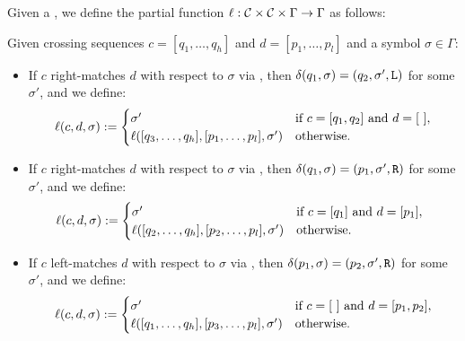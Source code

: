 \begin{defn}
	Given a \kDLA, we define the partial function $\ell:\mathcal C\times\mathcal C\times\Gamma\to\Gamma$ as follows:

	Given crossing sequences $c=[q_1,\dots,q_h]$ and $d=[p_1,\dots,p_l]$ and a symbol $\sigma\in\Gamma$:
	\begin{itemize}
		\item If $c$ right-matches $d$ with respect to $\sigma$ via , then $\delta(q_1,\sigma)=(q_2,\sigma',\mathtt L)$ for some $\sigma'$, and we define:
		      \begin{equation*}
			      \ell(c,d,\sigma):=\begin{cases}
				      \sigma'                                        & \text{if } c=[q_1,q_2] \text{ and } d=[~], \\
				      \ell([q_3,\dots,q_h],[p_1,\dots,p_l],\sigma') & \text{otherwise}.
			      \end{cases}
		      \end{equation*}
		\item If $c$ right-matches $d$ with respect to $\sigma$ via , then $\delta(q_1,\sigma)=(p_1,\sigma',\mathtt R)$ for some $\sigma'$, and we define:
		      \begin{equation*}
			      \ell(c,d,\sigma):=\begin{cases}
				      \sigma'                                        & \text{if } c=[q_1] \text{ and } d=[p_1],~~ \\
				      \ell([q_2,\dots,q_h],[p_2,\dots,p_l],\sigma') & \text{otherwise}.
			      \end{cases}
		      \end{equation*}
		\item If $c$ left-matches $d$ with respect to $\sigma$ via , then $\delta(p_1,\sigma)=(p_2,\sigma',\mathtt R)$ for some $\sigma'$, and we define:
		      \begin{equation*}
			      \last(c,d,\sigma):=\begin{cases}
				      \sigma'                                        & \text{if } c=[~] \text{ and } d=[p_1,p_2], \\
				      \last([q_1,\dots,q_h],[p_3,\dots,p_l],\sigma') & \text{otherwise}.
			      \end{cases}

\end{equation*}
\end{itemize}
\end{defn}
